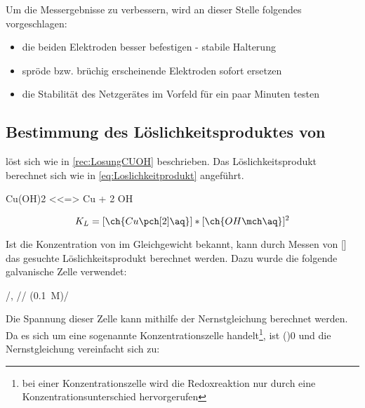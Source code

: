 \documentclass{article}
\begin{document}
        Um die Messergebnisse zu verbessern, wird an dieser Stelle folgendes vorgeschlagen: 
      
      \begin{itemize}
        \item die beiden Elektroden besser befestigen - stabile Halterung
        \item spröde bzw. brüchig erscheinende Elektroden sofort ersetzen
        \item die Stabilität des Netzgerätes im Vorfeld für ein paar Minuten testen
      \end{itemize}
        
    \pagebreak
    
    \subsection{Bestimmung des Löslichkeitsproduktes von }
      
       löst sich wie in \ref{rec:LosungCUOH} beschrieben. Das Löslichkeitsprodukt berechnet sich wie in \eqref{eq:Loslichkeitprodukt} angeführt.  
      
      \begin{reaction}
        Cu(OH)2\sld{} <<=> Cu\pch[2]\aq{} + 2 OH\mch\aq{} \label{rec:LosungCUOH}      
      \end{reaction}
      
      \begin{equation}
        K_{L} = [\ch{Cu\pch[2]\aq}] * [\ch{OH\mch\aq}]^2 \label{eq:Loslichkeitprodukt}
      \end{equation}
      
      Ist  die Konzentration von  im Gleichgewicht bekannt, kann durch Messen von [] das gesuchte Löslichkeitsprodukt berechnet werden. Dazu wurde die folgende galvanische Zelle verwendet:
      
      \begin{center}
        /, //  (\SI[mode=text]{0.1}{M})/
      \end{center}
      
      Die Spannung dieser Zelle kann mithilfe der Nernstgleichung berechnet werden. Da es sich um eine sogenannte Konzentrationszelle handelt\footnote{bei einer Konzentrationszelle wird die Redoxreaktion nur durch eine Konzentrationsunterschied hervorgerufen}, ist \ElPot[superscript=0](){0} und die Nernstgleichung vereinfacht sich zu:
      
\end{document}
